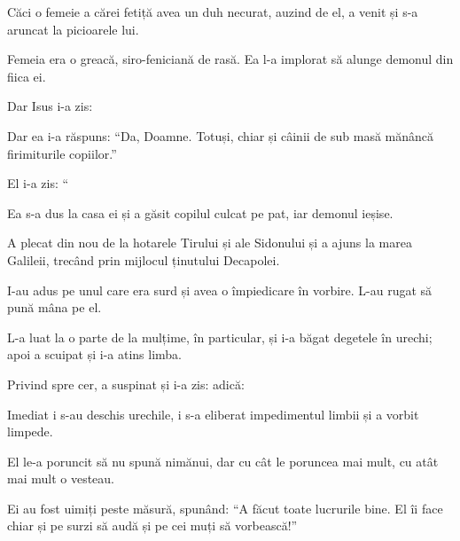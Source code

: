{Căci o femeie a cărei fetiță avea un duh necurat, auzind de el, a venit și s-a aruncat la picioarele lui.

Femeia era o greacă, siro-feniciană de rasă. Ea l-a implorat să alunge demonul din fiica ei.

Dar Isus i-a zis:
{}


\par }{\PP {}Dar ea i-a răspuns: “Da, Doamne. Totuși, chiar și câinii de sub masă mănâncă firimiturile copiilor.”


\par }{\PP {}El i-a zis: “{}


\par }{\PP {}Ea s-a dus la casa ei și a găsit copilul culcat pe pat, iar demonul ieșise.


\par }{\PP {}A plecat din nou de la hotarele Tirului și ale Sidonului și a ajuns la marea Galileii, trecând prin mijlocul ținutului Decapolei.

I-au adus pe unul care era surd și avea o împiedicare în vorbire. L-au rugat să pună mâna pe el.

L-a luat la o parte de la mulțime, în particular, și i-a băgat degetele în urechi; apoi a scuipat și i-a atins limba.

Privind spre cer, a suspinat și i-a zis:
{} adică:
{}

Imediat i s-au deschis urechile, i s-a eliberat impedimentul limbii și a vorbit limpede.

El le-a poruncit să nu spună nimănui, dar cu cât le poruncea mai mult, cu atât mai mult o vesteau.

Ei au fost uimiți peste măsură, spunând: “A făcut toate lucrurile bine. El îi face chiar și pe surzi să audă și pe cei muți să vorbească!”



\par }

